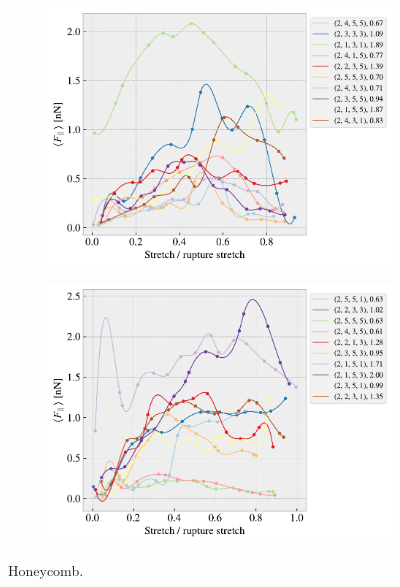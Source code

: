\begin{figure}[H]
\begin{subfigure}[b]{0.49\textwidth}
        \caption{}
        \label{fig:}
    \end{subfigure}
    \hfill
    \begin{subfigure}[b]{0.49\textwidth}
        \centering
        \includegraphics[width=\textwidth]{figures/stretch_profiles/honeycomb/SP_2_honeycomb.pdf}
        \caption{}
        \label{fig:}
    \end{subfigure}
    \hfill
    \begin{subfigure}[b]{0.49\textwidth}
        \centering
        \includegraphics[width=\textwidth]{figures/stretch_profiles/honeycomb/SP_3_honeycomb.pdf}
        \caption{}
        \label{fig:}
    \end{subfigure}
    \hfill
    \caption{Honeycomb.}
    \label{fig:}
\end{figure}


